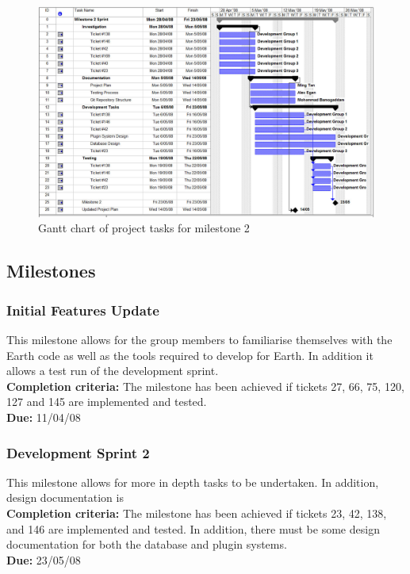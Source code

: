 \documentclass{article}
\begin{document}
\begin{figure}[htp]
\begin{centering}
\includegraphics[angle=90,scale=0.5]{./schedule-milestone2.jpg} 
\par\end{centering}
\caption{Gantt chart of project tasks for milestone 2}
\label{fig:schedule} 
\end{figure}

\subsection{Milestones}

\subsubsection{Initial Features Update}

This milestone allows for the group members to familiarise themselves with the Earth code as well as the tools required to develop for Earth. In addition it allows a test run of the development sprint.\\
\textbf{Completion criteria:} The milestone has been achieved if tickets 27, 66, 75, 120, 127 and 145 are implemented and tested.
\\
\textbf{Due:} 11/04/08

\subsubsection{Development Sprint 2}

This milestone allows for more in depth tasks to be undertaken. In addition, design documentation is  \\
\textbf{Completion criteria:} The milestone has been achieved if tickets 23, 42, 138, and 146 are implemented and tested. In addition, there must be some design documentation for both the database and plugin systems.
\\
\textbf{Due:} 23/05/08
\end{document}
